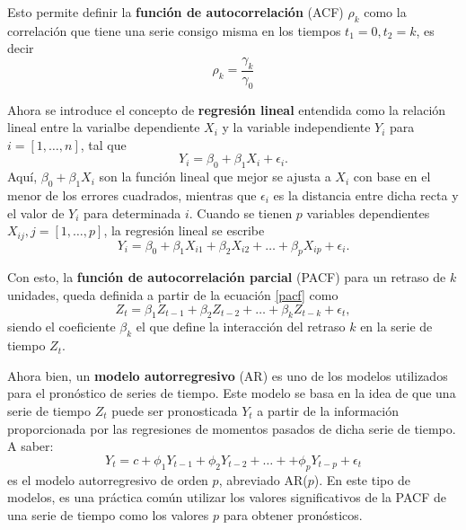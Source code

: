 \documentclass{elsarticle}
\begin{document}
Esto permite definir la \textbf{función de autocorrelación} (ACF) $\rho_k$ como la correlación que tiene una serie consigo misma en los tiempos $t_1 = 0, t_2 = k$, es decir
\begin{equation}
    \rho_k = \frac{\gamma_k}{\gamma_0}
\end{equation}

Ahora se introduce el concepto de \textbf{regresión lineal} entendida como la relación lineal entre la varialbe dependiente $X_i$ y la variable independiente $Y_i$ para $i = [1, \ldots, n]$, tal que
\begin{equation}
    Y_i = \beta_0 + \beta_1 X_i + \epsilon_i.
\end{equation}
Aquí, $\beta_0 + \beta_1 X_i$ son la función lineal que mejor se ajusta a $X_i$ con base en el menor de los errores cuadrados, mientras que $\epsilon_i$ es la distancia entre dicha recta y el valor de $Y_i$ para determinada $i$. Cuando se tienen $p$ variables dependientes $X_{ij}, j = [1, \ldots, p]$, la regresión lineal se escribe
\begin{equation}
\label{pacf}
    Y_i = \beta_0 + \beta_1 X_{i1} + \beta_2 X_{i2} + \ldots + \beta_p X_{ip} + \epsilon_i.
\end{equation}

Con esto, la \textbf{función de autocorrelación parcial} (PACF) para un retraso de $k$ unidades, queda definida a partir de la ecuación \ref{pacf} como
\begin{equation}
    Z_t = \beta_1 Z_{t-1} + \beta_2 Z_{t-2} + \ldots + \beta_k Z_{t-k} + \epsilon_t,
\end{equation}
siendo el coeficiente $\beta_k$ el que define la interacción del retraso $k$ en la serie de tiempo $Z_t$.

Ahora bien, un \textbf{modelo autorregresivo} (AR) es uno de los modelos utilizados para el pronóstico de series de tiempo. Este modelo se basa en la idea de que una serie de tiempo $Z_t$ puede ser pronosticada $Y_t$ a partir de la información proporcionada por las regresiones de momentos pasados de dicha serie de tiempo. A saber:
\begin{equation}
    Y_t = c + \phi_1 Y_{t-1} + \phi_2 Y_{t-2} + \ldots +  + \phi_p Y_{t-p} + \epsilon_t
\end{equation}
es el modelo autorregresivo de orden $p$, abreviado AR($p$). En este tipo de modelos, es una práctica común utilizar los valores significativos de la PACF de una serie de tiempo como los valores $p$ para obtener pronósticos.
\end{document}
